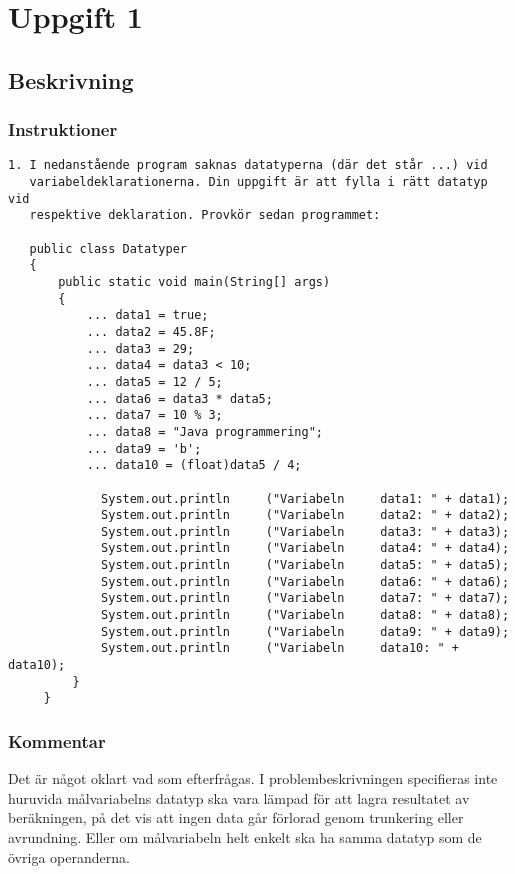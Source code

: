 \section{Uppgift 1}\label{uppgift-1}

\subsection{Beskrivning}
\subsubsection*{Instruktioner}
\begin{verbatim}
1. I nedanstående program saknas datatyperna (där det står ...) vid
   variabeldeklarationerna. Din uppgift är att fylla i rätt datatyp vid
   respektive deklaration. Provkör sedan programmet:

   public class Datatyper
   {
       public static void main(String[] args)
       {
           ... data1 = true;
           ... data2 = 45.8F;
           ... data3 = 29;
           ... data4 = data3 < 10;
           ... data5 = 12 / 5;
           ... data6 = data3 * data5;
           ... data7 = 10 % 3;
           ... data8 = "Java programmering";
           ... data9 = 'b';
           ... data10 = (float)data5 / 4;

             System.out.println     ("Variabeln     data1: " + data1);
             System.out.println     ("Variabeln     data2: " + data2);
             System.out.println     ("Variabeln     data3: " + data3);
             System.out.println     ("Variabeln     data4: " + data4);
             System.out.println     ("Variabeln     data5: " + data5);
             System.out.println     ("Variabeln     data6: " + data6);
             System.out.println     ("Variabeln     data7: " + data7);
             System.out.println     ("Variabeln     data8: " + data8);
             System.out.println     ("Variabeln     data9: " + data9);
             System.out.println     ("Variabeln     data10: " + data10);
         }
     }
\end{verbatim}

\subsubsection*{Kommentar}
Det är något oklart vad som efterfrågas. I problembeskrivningen specifieras
inte huruvida målvariabelns datatyp ska vara lämpad för att lagra resultatet av
beräkningen, på det vis att ingen data går förlorad genom trunkering eller
avrundning.  Eller om målvariabeln helt enkelt ska ha samma datatyp som de
övriga operanderna.

